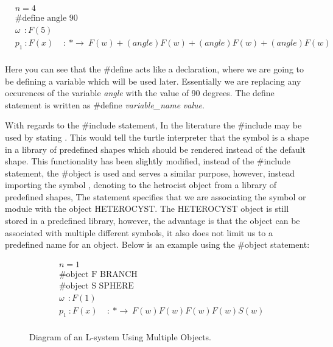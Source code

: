\begin{equation} \label{define statement example}
\begin{aligned}
	&n=4 \\
	&\textrm{\#define angle 90}\\
	&\omega~~ : F(5)\\
	&p_1~ :  F(x)~~~~~ :~ * \rightarrow~ F(w)+(angle)F(w)+(angle)F(w)+(angle)F(w)\\
\end{aligned}
\end{equation}

Here you can see that the \#define acts like a declaration, where we are going to be defining a variable which will be used later. Essentially we are replacing any occurences of the variable \textit{angle} with the value of 90 degrees. The define statement is written as  \#define \textit{variable\_name} \textit{value}.

With regards to the \#include statement, In the literature the \#include may be used by stating . This would tell the turtle interpreter that the symbol  is a shape in a library of predefined shapes which should be rendered instead of the default shape. This functionality has been slightly modified, instead of the \#include statement, the \#object is used and serves a similar purpose, however, instead importing the symbol , denoting to the hetrocist object from a library of predefined shapes, The statement  specifies that we are associating the symbol or module  with the object HETEROCYST. The HETEROCYST object is still stored in a predefined library, however, the advantage is that the object can be associated with multiple different symbols, it also does not limit us to a predefined name for an object. Below is an example using the \#object statement: 

\begin{equation} \label{object statement example}
\begin{aligned}
	&n=1 \\
	&\textrm{\#object F BRANCH}\\
	&\textrm{\#object S SPHERE}\\
	&\omega~~ : F(1)\\
	&p_1~ :  F(x)~~~~~ :~ * \rightarrow~ F(w)F(w)F(w)F(w)S(w)\\
\end{aligned}
\end{equation}

\begin{figure}[htbp]
	{\centering
		\vspace{7px}
		\setlength{\fboxrule}{1pt}
		\caption{Diagram of an L-system Using Multiple Objects.}
	}
\end{figure}
\FloatBarrier

